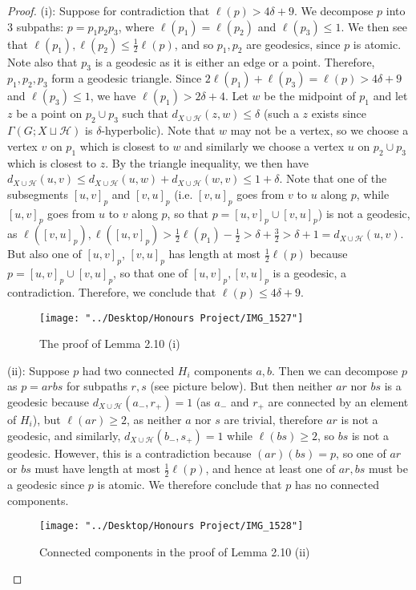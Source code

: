 \documentclass[12pt]{article}
\newcommand{\vs}{\vskip10pt}
\begin{document}
	\begin{proof}
		
		(i): Suppose for contradiction that $\ell(p) > 4 \delta + 9$. We decompose $p$ into 3 subpaths: $p = p_1 p_2 p_3$, where $\ell(p_1) = \ell(p_2)$ and $\ell(p_3) \leq 1$. We then see that $\ell(p_1),\ell(p_2) \leq \frac{1}{2}\ell(p)$, and so $p_1, p_2$ are geodesics, since $p$ is atomic. Note also that $p_3$ is a geodesic as it is either an edge or a point. Therefore, $p_1,p_2,p_3$ form a geodesic triangle. Since $2 \ell(p_1) + \ell(p_3) = \ell(p) > 4 \delta + 9$ and $\ell(p_3) \leq 1$, we have $\ell(p_1) > 2 \delta + 4$. Let $w$ be the midpoint of $p_1$ and let $z$ be a point on $p_2 \cup p_3$ such that $d_{X \cup \mathcal{H}}(z, w) \leq \delta$ (such a $z$ exists since $\Gamma(G; X \sqcup \mathcal{H})$ is $\delta$-hyperbolic). Note that $w$ may not be a vertex, so we choose a vertex $v$ on $p_1$ which is closest to $w$ and similarly we choose a vertex $u$ on $p_2 \cup p_3$ which is closest to $z$. By the triangle inequality, we then have $d_{X \cup \mathcal{H}}(u,v) \leq d_{X \cup \mathcal{H}}(u,w) + d_{X \cup \mathcal{H}}(w, v) \leq 1 + \delta$. Note that one of the subsegments $[u,v]_p$ and $[v,u]_p$ (i.e. $[v,u]_p$ goes from $v$ to $u$ along $p$, while $[u,v]_p$ goes from $u$ to $v$ along $p$, so that $p = [u,v]_p \cup [v,u]_p$) is not a geodesic, as $\ell([v,u]_p), \ell([u,v]_p) > \frac{1}{2} \ell(p_1) - \frac{1}{2} > \delta + \frac{3}{2} > \delta + 1 = d_{X \cup \mathcal{H}}(u,v)$. But also one of $[u,v]_p$, $[v,u]_p$ has length at most $\frac{1}{2} \ell(p)$ because $p = [u,v]_p \cup [v,u]_p$, so that one of $[u,v]_p, [v,u]_p$ is a geodesic, a contradiction. Therefore, we conclude that $\ell(p) \leq 4 \delta + 9$. 
		
\begin{figure} [H]
	\centering
	\texttt{[image: "../Desktop/Honours Project/IMG\_1527"]}
	\caption{The proof of Lemma 2.10 (i)}
	\label{fig:img1527}
\end{figure}
		
		\vs 
		
		(ii): Suppose $p$ had two connected $H_i$ components $a,b$. Then we can decompose $p$ as $p = a r b s$ for subpaths $r,s$ (see picture below). But then neither $ar$ nor $bs$ is a geodesic because $d_{X \cup \mathcal{H}}(a_-, r_+) = 1$ (as $a_-$ and $r_+$ are connected by an element of $H_i$), but $\ell(ar) \geq 2$, as neither $a$ nor $s$ are trivial, therefore $ar$ is not a geodesic, and similarly, $d_{X \cup \mathcal{H}}(b_-, s_+) = 1$ while $\ell(bs) \geq 2$, so $bs$ is not a geodesic. However, this is a contradiction because $(ar)(bs) = p$, so one of $ar$ or $bs$ must have length at most $\frac{1}{2} \ell(p)$, and hence at least one of $ar, bs$ must be a geodesic since $p$ is atomic. We therefore conclude that $p$ has no connected components.
		
\begin{figure} [H]
	\centering
	\texttt{[image: "../Desktop/Honours Project/IMG\_1528"]}
	\caption{Connected components in the proof of Lemma 2.10 (ii)}
	\label{fig:img1528}
\end{figure}
		
	\end{proof}
\end{document}
